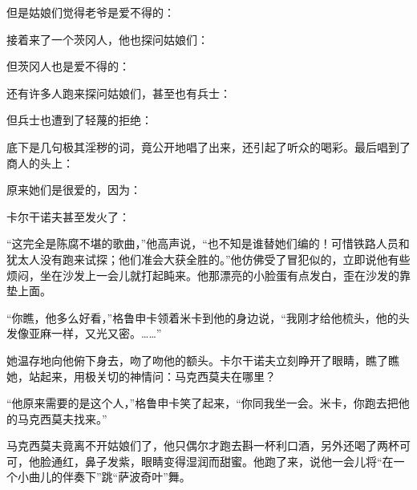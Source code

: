 \par 但是姑娘们觉得老爷是爱不得的：
\par 接着来了一个茨冈人，他也探问姑娘们：
\par 但茨冈人也是爱不得的：
\par 还有许多人跑来探问姑娘们，甚至也有兵士：
\par 但兵士也遭到了轻蔑的拒绝：
\par 底下是几句极其淫秽的词，竟公开地唱了出来，还引起了听众的喝彩。最后唱到了商人的头上：
\par 原来她们是很爱的，因为：
\par 卡尔干诺夫甚至发火了：
\par “这完全是陈腐不堪的歌曲，”他高声说，“也不知是谁替她们编的！可惜铁路人员和犹太人没有跑来试探；他们准会大获全胜的。”他仿佛受了冒犯似的，立即说他有些烦闷，坐在沙发上一会儿就打起盹来。他那漂亮的小脸蛋有点发白，歪在沙发的靠垫上面。
\par “你瞧，他多么好看，”格鲁申卡领着米卡到他的身边说，“我刚才给他梳头，他的头发像亚麻一样，又光又密。……”
\par 她温存地向他俯下身去，吻了吻他的额头。卡尔干诺夫立刻睁开了眼睛，瞧了瞧她，站起来，用极关切的神情问：马克西莫夫在哪里？
\par “他原来需要的是这个人，”格鲁申卡笑了起来，“你同我坐一会。米卡，你跑去把他的马克西莫夫找来。”
\par 马克西莫夫竟离不开姑娘们了，他只偶尔才跑去斟一杯利口酒，另外还喝了两杯可可，他脸通红，鼻子发紫，眼睛变得湿润而甜蜜。他跑了来，说他一会儿将“在一个小曲儿的伴奏下”跳“萨波奇叶”舞。

